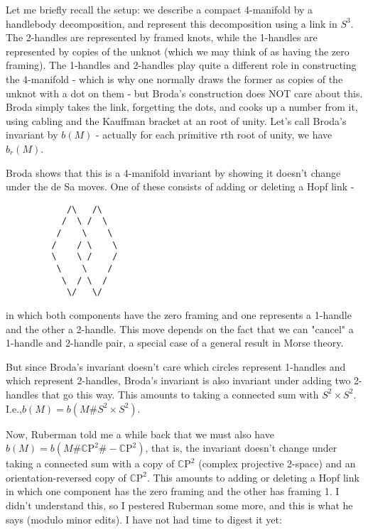 
Let me briefly recall the setup: we describe a compact 4-manifold by a handlebody decomposition, and represent this decomposition using a link in $S^3$. The 2-handles are represented by framed knots, while the 1-handles are represented by copies of the unknot (which we may think of as having the zero framing). The 1-handles and 2-handles play quite a different role in constructing the 4-manifold - which is why one normally draws the former as copies of the unknot with a dot on them - but Broda's construction does NOT care about this. Broda simply takes the link, forgetting the dots, and cooks up a number from it, using cabling and the Kauffman bracket at an root of unity. Let's call Broda's invariant by $b(M)$ - actually for each primitive rth root of unity, we have $b_r(M)$.

Broda shows that this is a 4-manifold invariant by showing it doesn't change under the de Sa moves. One of these consists of adding or deleting a Hopf link -
\begin{verbatim}
            /\   /\
           /  \ /  \
          /    \    \       
         /    / \    \       
         \    \ /    /
          \    \    /
           \  / \  /
            \/   \/
\end{verbatim}


in which both components have the zero framing and one represents a 1-handle and the other a 2-handle. This move depends on the fact that we can "cancel" a 1-handle and 2-handle pair, a special case of a general result in Morse theory.

But since Broda's invariant doesn't care which circles represent 1-handles and which represent 2-handles, Broda's invariant is also invariant under adding two 2-handles that go this way. This amounts to taking a connected sum with $S^2 \times S^2$. I.e.,$ b(M) = b(M \# S^2 \times S^2)$.

Now, Ruberman told me a while back that we must also have $b(M) = b(M \#  \mathbb{C}\mathrm{P}^2 \# - \mathbb{C}\mathrm{P}^2)$, that is, the invariant doesn't change under taking a connected sum with a copy of $ \mathbb{C}\mathrm{P}^2$ (complex projective 2-space) and an orientation-reversed copy of $ \mathbb{C}\mathrm{P}^2$. This amounts to adding or deleting a Hopf link in which one component has the zero framing and the other has framing 1. I didn't understand this, so I pestered Ruberman some more, and this is what he says (modulo minor edits). I have not had time to digest it yet:

